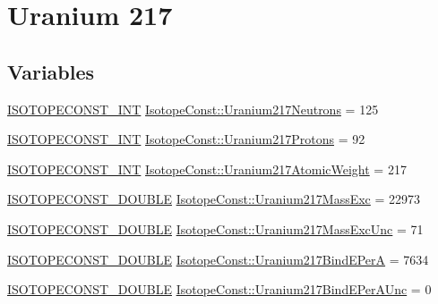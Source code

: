 \hypertarget{group___isotope_const-_uranium-_u217}{}\section{Uranium 217}
\label{group___isotope_const-_uranium-_u217}
\subsection*{Variables}
\begin{DoxyCompactItemize}
\item 
\mbox{\hyperlink{group___isotope_const-_macros_ga5f18360b3e99483a35c32d789e62621c}{I\+S\+O\+T\+O\+P\+E\+C\+O\+N\+S\+T\+\_\+\+I\+NT}} \mbox{\hyperlink{group___isotope_const-_uranium-_u217_ga0498aa7aa1b60de16499735a9bb3b34e}{Isotope\+Const\+::\+Uranium217\+Neutrons}} = 125
\item 
\mbox{\hyperlink{group___isotope_const-_macros_ga5f18360b3e99483a35c32d789e62621c}{I\+S\+O\+T\+O\+P\+E\+C\+O\+N\+S\+T\+\_\+\+I\+NT}} \mbox{\hyperlink{group___isotope_const-_uranium-_u217_ga1cb31e355e0023cba587dfca37c7b55a}{Isotope\+Const\+::\+Uranium217\+Protons}} = 92
\item 
\mbox{\hyperlink{group___isotope_const-_macros_ga5f18360b3e99483a35c32d789e62621c}{I\+S\+O\+T\+O\+P\+E\+C\+O\+N\+S\+T\+\_\+\+I\+NT}} \mbox{\hyperlink{group___isotope_const-_uranium-_u217_ga0b31c633291e0535fc702e4eb8455227}{Isotope\+Const\+::\+Uranium217\+Atomic\+Weight}} = 217
\item 
\mbox{\hyperlink{group___isotope_const-_macros_ga8f45a7272ce02c0b4c65c44636ed719a}{I\+S\+O\+T\+O\+P\+E\+C\+O\+N\+S\+T\+\_\+\+D\+O\+U\+B\+LE}} \mbox{\hyperlink{group___isotope_const-_uranium-_u217_ga376e9d27c83550a09374385da910eacb}{Isotope\+Const\+::\+Uranium217\+Mass\+Exc}} = 22973
\item 
\mbox{\hyperlink{group___isotope_const-_macros_ga8f45a7272ce02c0b4c65c44636ed719a}{I\+S\+O\+T\+O\+P\+E\+C\+O\+N\+S\+T\+\_\+\+D\+O\+U\+B\+LE}} \mbox{\hyperlink{group___isotope_const-_uranium-_u217_ga586bc2ef240867162a1b24a0f30af56c}{Isotope\+Const\+::\+Uranium217\+Mass\+Exc\+Unc}} = 71
\item 
\mbox{\hyperlink{group___isotope_const-_macros_ga8f45a7272ce02c0b4c65c44636ed719a}{I\+S\+O\+T\+O\+P\+E\+C\+O\+N\+S\+T\+\_\+\+D\+O\+U\+B\+LE}} \mbox{\hyperlink{group___isotope_const-_uranium-_u217_ga9fdb2e656c5533fa170a99ac476c248b}{Isotope\+Const\+::\+Uranium217\+Bind\+E\+PerA}} = 7634
\item 
\mbox{\hyperlink{group___isotope_const-_macros_ga8f45a7272ce02c0b4c65c44636ed719a}{I\+S\+O\+T\+O\+P\+E\+C\+O\+N\+S\+T\+\_\+\+D\+O\+U\+B\+LE}} \mbox{\hyperlink{group___isotope_const-_uranium-_u217_ga0ec91581c695efe11d96b7e2ecac8c86}{Isotope\+Const\+::\+Uranium217\+Bind\+E\+Per\+A\+Unc}} = 0

\end{DoxyCompactItemize}
